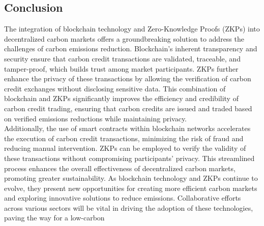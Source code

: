 \documentclass[preprint,12pt]{elsarticle}
\begin{document}
\subsection{Conclusion}
The integration of blockchain technology and Zero-Knowledge Proofs (ZKPs) into decentralized carbon markets offers a groundbreaking solution to address the challenges of carbon emissions reduction. Blockchain’s inherent transparency and security ensure that carbon credit transactions are validated, traceable, and tamper-proof, which builds trust among market participants. ZKPs further enhance the privacy of these transactions by allowing the verification of carbon credit exchanges without disclosing sensitive data. This combination of blockchain and ZKPs significantly improves the efficiency and credibility of carbon credit trading, ensuring that carbon credits are issued and traded based on verified emissions reductions while maintaining privacy.\\
Additionally, the use of smart contracts within blockchain networks accelerates the execution of carbon credit transactions, minimizing the risk of fraud and reducing manual intervention. ZKPs can be employed to verify the validity of these transactions without compromising participants' privacy. This streamlined process enhances the overall effectiveness of decentralized carbon markets, promoting greater sustainability. As blockchain technology and ZKPs continue to evolve, they present new opportunities for creating more efficient carbon markets and exploring innovative solutions to reduce emissions. Collaborative efforts across various sectors will be vital in driving the adoption of these technologies, paving the way for a low-carbon 


 



\end{document}
